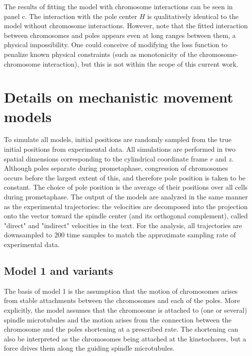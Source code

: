 \documentclass[times, twoside,onecolumn]{zHenriquesLab-StyleBioRxiv}
\begin{document}
The results of fitting the model with chromosome interactions can be seen in panel c. The interaction with the pole center $H$ is qualitatively identical to the model without chromosome interactions. However, note that the fitted interaction between chromosomes and poles appears even at long ranges between them, a physical impossibility. One could conceive of modifying the loss function to penalize known physical constraints (such as monotonicity of the chromosome-chromosome interaction), but this is not within the scope of this current work. 


\section{Details on mechanistic movement models}
\label{sect:supp4sims}


To simulate all models, initial positions are randomly sampled from the true initial positions from experimental data. All simulations are performed in two spatial dimensions corresponding to the cylindrical coordinate frame $r$ and $z$. Although  poles separate during prometaphase, congression of chromosomes occurs before the largest extent of this, and therefore pole position is taken to be constant. The choice of pole position is the average of their positions over all cells during prometaphase. The output of the models are analyzed in the same manner as the experimental trajectories: the velocities are decomposed into the projection onto the vector toward the spindle center (and its orthogonal complement), called "direct" and "indirect" velocities in the text. For the analysis, all trajectories are downsampled to $200$ time samples to match the approximate sampling rate of experimental data.  

\subsection{Model 1 and variants}

The basis of model 1 is the assumption that the motion of chromosomes arises from stable attachments between the chromosomes and each of the poles. More explicitly, the model assumes that the chromosome is attached to (one or several) spindle microtubules and the motion arises from the connection between the chromosome and the poles shortening at a prescribed rate. The shortening can also be interpreted as the chromosomes being attached at the kinetochores, but a force drives them along the guiding spindle microtubules. 
\end{document}
